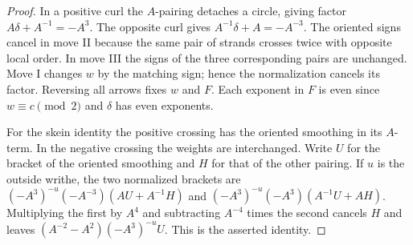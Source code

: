 \begin{proof}
In a positive curl the $A$-pairing detaches a circle, giving factor
$A\delta+A^{-1}=-A^3$. The opposite curl gives
$A^{-1}\delta+A=-A^{-3}$. The oriented signs cancel in move II because
the same pair of strands crosses twice with opposite local order. In
move III the signs of the three corresponding pairs are unchanged. Move I
changes $w$ by the matching sign; hence the normalization cancels its
factor. Reversing all arrows fixes $w$ and $F$. Each exponent in $F$ is
even since $w\equiv c\pmod 2$ and $\delta$ has even exponents.

For the skein identity the positive crossing has the oriented smoothing
in its $A$-term. In the negative crossing the weights are interchanged.
Write $U$ for the bracket of the oriented smoothing and $H$ for that of
the other pairing. If $u$ is the outside writhe, the two normalized
brackets are $(-A^3)^{-u}(-A^{-3})(AU+A^{-1}H)$ and
$(-A^3)^{-u}(-A^{3})(A^{-1}U+AH)$. Multiplying the first by $A^4$
and subtracting $A^{-4}$ times the second cancels $H$ and leaves
$(A^{-2}-A^{2})(-A^3)^{-u}U$. This is the asserted identity.
\end{proof}

